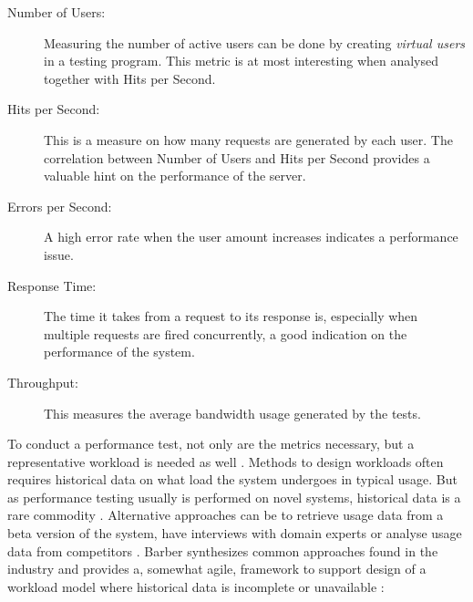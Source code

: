 \begin{description}
  \item[Number of Users:] Measuring the number of active users can be done by
    creating \textit{virtual users} in a testing program. This metric is at
    most interesting when analysed together with Hits per Second.
  \item[Hits per Second:] This is a measure on how many requests are generated
    by each user. The correlation between Number of Users and Hits per Second
    provides a valuable hint on the performance of the server.
  \item[Errors per Second:] A high error rate when the user amount increases
    indicates a performance issue.
  \item[Response Time:] The time it takes from a request to its response is,
    especially when multiple requests are fired concurrently, a good indication
    on the performance of the system.
  \item[Throughput:] This measures the average bandwidth usage generated by the
    tests.
\end{description}

To conduct a performance test, not only are the metrics necessary, but a
representative workload is needed as well \cite{weyuker2000experience}.
Methods to design workloads often requires historical data on what load the
system undergoes in typical usage. But as performance testing usually is
performed on novel systems, historical data is a rare commodity
\cite{barber2004creating}. Alternative approaches can be to retrieve usage data
from a beta version of the system, have interviews with domain experts or
analyse usage data from competitors \cite{jiang2015survey}. Barber synthesizes
common approaches found in the industry and provides a, somewhat agile,
framework to support design of a workload model where historical data is
incomplete or unavailable \cite{barber2004creating}:

